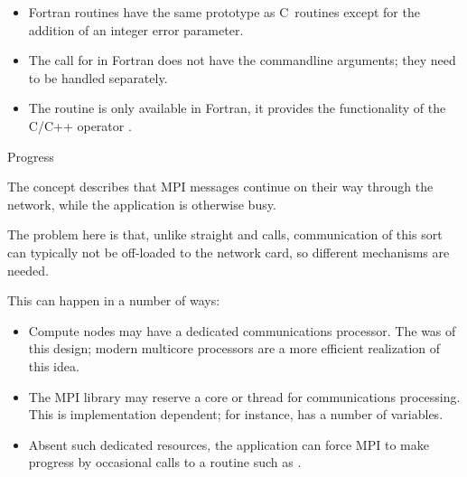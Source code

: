 \begin{itemize}
\item Fortran routines have the same prototype as C~routines except for the addition
  of an integer error parameter.
\item The call for
   in Fortran
  does not have the commandline arguments;
  they need to be handled separately.
\item The routine  is only available in
  Fortran, it provides the functionality of the C/C++ operator
  .
\end{itemize}


 {Progress}
\label{sec:progress}

The concept  describes
that MPI messages continue on their way through the network,
while the application is otherwise busy.

The problem here is that, unlike straight  and
 calls,
communication of this sort can 
typically not be off-loaded to the network card, so different
mechanisms are needed.

This can happen in a number of ways:
\begin{itemize}
\item Compute nodes may have a dedicated communications processor. The
   was of this design; modern
  multicore processors are a more efficient realization of this idea.
\item The MPI library may reserve a core or thread for communications
  processing. This is implementation dependent; for instance,
   has a number of
   variables.
\item Absent such dedicated resources, the application can force MPI
  to make progress by occasional calls to a 
  routine such as .
\end{itemize}

